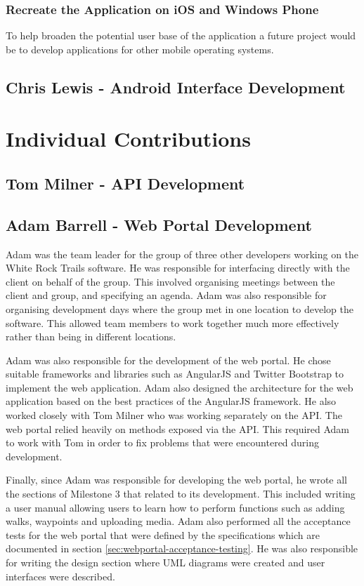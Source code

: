 \documentclass[11pt,a4paper]{report}
\begin{document}
\subsubsection{Recreate the Application on iOS and Windows Phone}
To help broaden the potential user base of the application a future project would be to develop applications for other mobile operating systems.

\subsection{Chris Lewis - Android Interface Development}

\section{Individual Contributions}
\label{sec:individual-contributions}

\subsection{Tom Milner - API Development}
\subsection{Adam Barrell - Web Portal Development}
Adam was the team leader for the group of three other developers working on the White Rock Trails software. He was responsible for interfacing directly with the client on behalf of the group. This involved organising meetings between the client and group, and specifying an agenda. Adam was also responsible for organising development days where the group met in one location to develop the software. This allowed team members to work together much more effectively rather than being in different locations.

Adam was also responsible for the development of the web portal. He chose suitable frameworks and libraries such as AngularJS and Twitter Bootstrap to implement the web application. Adam also designed the architecture for the web application based on the best practices of the AngularJS framework. He also worked closely with Tom Milner who was  working separately on the API. The web portal relied heavily on methods exposed via the API. This required Adam to work with Tom in order to fix problems that were encountered during development.

Finally, since Adam was responsible for developing the web portal, he wrote all the sections of Milestone 3 that related to its development. This included writing a user manual allowing users to learn how to perform functions such as adding walks, waypoints and uploading media. Adam also performed all the acceptance tests for the web portal that were defined by the specifications which are documented in section \ref{sec:webportal-acceptance-testing}. He was also responsible for writing the design section where UML diagrams were created and user interfaces were described.
\end{document}
